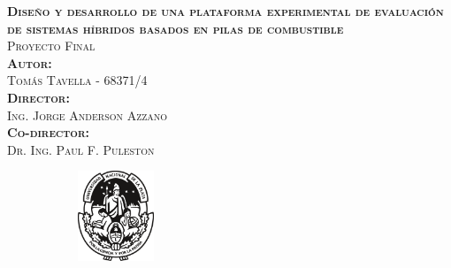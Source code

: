     \begin{titlepage}
        \begin{center}
            \vspace*{0.5cm}
            \Huge
            \scshape 
            \textbf{Diseño y desarrollo de una plataforma experimental de evaluación de sistemas híbridos basados en pilas de combustible}    %
            \normalfont
            \\
            \vspace{0.5cm}
            \huge
            Proyecto Final                                       %
            \\
            \vspace{2cm}
            \Large\scshape
            \textbf{Autor:}
            \normalfont
            \\
            \large
            \vspace{0.2cm}
            Tomás Tavella - 68371/4
            \\
            \vspace{1cm}
            \Large\scshape
            \textbf{Director:}
            \normalfont
            \\
            \vspace{0.2cm}
            \large
            Ing. Jorge Anderson Azzano
            \\
            \vspace{0.3cm}
            \Large\scshape
            \textbf{Co-director:}
            \normalfont
            \\
            \vspace{0.2cm}
            \large
            Dr. Ing. Paul F. Puleston
            \\
            \vfill
            \begin{figure}[H]
                \centering
                \begin{subfigure}
                    \centering
                    \includegraphics[width=0.25\textwidth]{Imagenes/UNLP.pdf}
                \end{subfigure}

\end{figure}
\end{center}
\end{titlepage}
